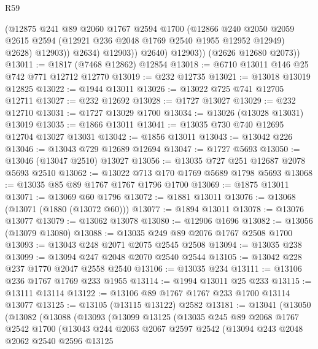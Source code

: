 \begin{lexlean}{R59}
\begin{coremodule}
                    (@12875
                      @241
                      @89
                      @2060
                      @1767
                      @2594
                      @1700
                      (@12866
                        @240
                        @2050
                        @2059
                        @2615
                        @2594
                        (@12921 @236 @2048 @1769 @2540 @1955 @12952 @12949)
                        @2628)
                      @12903))
                  @2634)
                @12903))
            @2640)
          @12903))
      (@2626 @12680 @2073))
@13011 := @1817 (@7468 @12862) @12854
@13018 := @6710 @13011 @146 @25 @742 @771 @12712 @12770
@13019 := @232 @12735
@13021 := @13018 @13019 @12825
@13022 := @1944 @13011
@13026 := @13022 @725 @741 @12705 @12711
@13027 := @232 @12692
@13028 := @1727 @13027
@13029 := @232 @12710
@13031 := @1727 @13029 @1700
@13034 := @13026 (@13028 @13031) @13019
@13035 := @1866 @13011
@13041 := @13035 @730 @740 @12695 @12704 @13027 @13031
@13042 := @1856 @13011
@13043 := @13042 @226
@13046 := @13043 @729 @12689 @12694
@13047 := @1727 @5693
@13050 := @13046 (@13047 @2510) @13027
@13056 := @13035 @727 @251 @12687 @2078 @5693 @2510
@13062 := @13022 @713 @170 @1769 @5689 @1798 @5693
@13068 := @13035 @85 @89 @1767 @1767 @1796 @1700
@13069 := @1875 @13011
@13071 := @13069 @60 @1796
@13072 := @1881 @13011
@13076 := @13068 (@13071 (@1880 (@13072 @60)))
@13077 := @1894 @13011
@13078 := @13076 @13077
@13079 := @13062 @13078
@13080 := @12906 @1696
@13082 := @13056 (@13079 @13080)
@13088 := @13035 @249 @89 @2076 @1767 @2508 @1700
@13093 := @13043 @248 @2071 @2075 @2545 @2508
@13094 := @13035 @238
@13099 := @13094 @247 @2048 @2070 @2540 @2544
@13105 := @13042 @228 @237 @1770 @2047 @2558 @2540
@13106 := @13035 @234
@13111 := @13106 @236 @1767 @1769 @233 @1955
@13114 := @1994 @13011 @25 @233
@13115 := @13111 @13114
@13122 := @13106 @89 @1767 @1767 @233 @1700 @13114 @13077
@13125 := @13105 (@13115 @13122) @2582
@13181 := @13041
    (@13050
      (@13082
        (@13088
          (@13093
            (@13099
              @13125
              (@13035
                @245
                @89
                @2068
                @1767
                @2542
                @1700
                (@13043
                  @244
                  @2063
                  @2067
                  @2597
                  @2542
                  (@13094
                    @243
                    @2048
                    @2062
                    @2540
                    @2596
                    @13125

\end{coremodule}
\end{lexlean}
